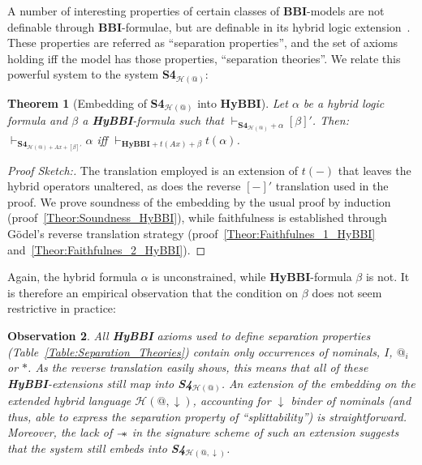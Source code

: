 \documentclass[a4paper]{article}
\newtheorem{theorem}{Theorem}[section]
\newtheorem{observation}[theorem]{Observation}
\newcommand\magicwand{\mathrel{-\mkern-6mu*}}
\newcommand{\BBI}{\textbf{BBI}\xspace}
\newcommand{\SFour}{\textbf{S4}\xspace}
\newcommand{\rev}[1]{[#1]'}
\begin{document}
A number of interesting properties of certain classes of \BBI-models are not definable through \BBI-formulae, but are definable in its hybrid logic extension~\cite{separation_theories}. These properties are referred as ``separation properties'', and the set of axioms holding iff the model has those properties, ``separation theories''. We relate this powerful system to the system \SFour$_{\mathcal{H}(@)}$:



\begin{theorem}[Embedding of \SFour$_{\mathcal{H}(@)}$ into \textbf{HyBBI}] \label{Hybrid_Embedding} Let $\alpha$ be a hybrid logic formula and $\beta$ a \textbf{HyBBI}-formula such that $\vdash_{\SFour_{\mathcal{H}(@)} + \alpha}[\beta]'$. Then: $\vdash_{\SFour_{\mathcal{H}(@)+Ax+[\beta]'}} \alpha$ iff $\vdash_{\textbf{HyBBI}+t(Ax)+\beta} t(\alpha)$.  



\end{theorem}

\begin{proof}[Proof Sketch:]
The translation employed is an extension of $t(-)$ that leaves the hybrid operators unaltered, as does the reverse $\rev{-}$ translation used in the proof. We prove soundness of the embedding by the usual proof by induction (proof~\ref{Theor:Soundness_HyBBI}), while faithfulness is established through G\"odel's reverse translation strategy (proof~\ref{Theor:Faithfulnes_1_HyBBI} and~\ref{Theor:Faithfulnes_2_HyBBI}).
    
\end{proof}

Again, the hybrid formula $\alpha$ is unconstrained, while \textbf{HyBBI}-formula $\beta$ is not. It is therefore an empirical observation that the condition on $\beta$ does not seem restrictive in practice:

\begin{observation}
All \textbf{HyBBI} axioms used to define separation properties (Table~\ref{Table:Separation_Theories}) contain only occurrences of nominals, $I$, $@_i$ or $*$. As the reverse translation easily shows, this means that all of these \textbf{HyBBI}-extensions still map into \SFour$_{\mathcal{H}(@)}$. An extension of the embedding on the extended hybrid language $\mathcal{H}(@, \downarrow)$, accounting for $\downarrow$ binder of nominals (and thus, able to express the separation property of ``splittability'') is straightforward. Moreover, the lack of $\magicwand$ in the signature scheme of such an extension suggests that the system still embeds into \SFour$_{\mathcal{H}(@, \downarrow)}$.  
\end{observation}
\end{document}
